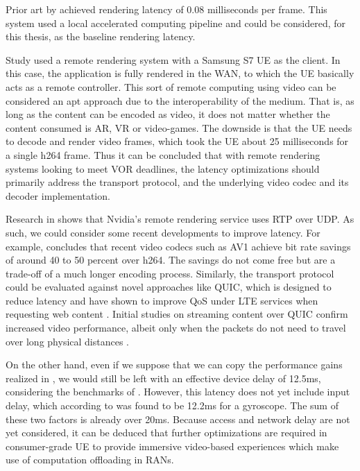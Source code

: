 \documentclass[12pt]{article}
\begin{document}
Prior art by \cite{lincoln2016motion} achieved rendering latency of 0.08 milliseconds per frame. This system used a local accelerated computing pipeline and could be considered, for this thesis, as the baseline rendering latency.

Study \cite{kamarainen2017measurement} used a remote rendering system with a Samsung S7 \gls{UE} as the client. In this case, the application is fully rendered in the \gls{WAN}, to which the \gls{UE} basically acts as a remote controller. This sort of remote computing using video can be considered an apt approach due to the interoperability of the medium. That is, as long as the content can be encoded as video, it does not matter whether the content consumed is \gls{AR}, \gls{VR} or video-games. The downside is that the \gls{UE} needs to decode and render video frames, which took the \gls{UE} about 25 milliseconds for a single h264 frame. Thus it can be concluded that with remote rendering systems looking to meet \gls{VOR} deadlines, the latency optimizations should primarily address the transport protocol, and the underlying video codec and its decoder implementation.

Research in \cite{suznjevic2016analysis} shows that Nvidia's remote rendering service uses \gls{RTP} over \gls{UDP}. As such, we could consider some recent developments to improve latency. For example, \cite{website:facebook-av1} concludes that recent video codecs such as \gls{AV1} achieve bit rate savings of around 40 to 50 percent over h264. The savings do not come free but are a trade-off of a much longer encoding process. Similarly, the transport protocol could be evaluated against novel approaches like \gls{QUIC}, which is designed to reduce latency \cite{langley2017quic} and have shown to improve \gls{QoS} under \gls{LTE} services when requesting web content \cite{qian2018achieving}. Initial studies on streaming content over \gls{QUIC} confirm increased video performance, albeit only when the packets do not need to travel over long physical distances \cite{bhat2017not}.

On the other hand, even if we suppose that we can copy the performance gains realized in \cite{website:facebook-av1}, we would still be left with an effective device delay of 12.5ms, considering the benchmarks of \cite{kamarainen2017measurement}. However, this latency does not yet include input delay, which according to \cite{kamarainen2017measurement} was found to be 12.2ms for a gyroscope. The sum of these two factors is already over 20ms. Because access and network delay are not yet considered, it can be deduced that further optimizations are required in consumer-grade \gls{UE} to provide immersive video-based experiences which make use of computation offloading in \glspl{RAN}.
\end{document}
